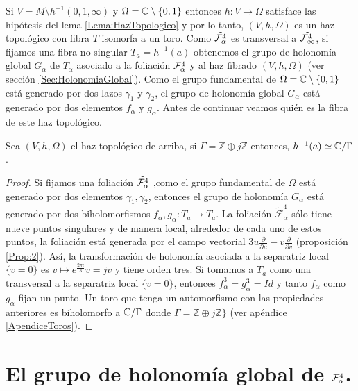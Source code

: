  Si $V=M\setminus h^{-1}(0,1,\infty)$ y $\Omega=\mathbb{C}\setminus\{0,1\}$ entonces $h\colon V\rightarrow\Omega$ satisface las hipótesis del lema \ref{Lema:HazTopologico} y por lo tanto, $(V,h,\Omega)$ es un haz topológico con fibra $T$ isomorfa a un toro. Como $\tilde{\mathcal{F}_{\alpha}^{4}}$ es transversal a $\tilde{\mathcal{F}_{\infty}^{4}}$, si fijamos una fibra no singular $T_{a}=h^{-1}(a)$ obtenemos el grupo de holonomía global $G_{\alpha}$ de $T_{\alpha}$ asociado a la foliación $\tilde{\mathcal{F}_{\alpha}^{4}}$ y al haz fibrado $(V,h,\Omega)$ (ver sección \ref{Sec:HolonomiaGlobal}). Como el grupo fundamental de $\Omega=\mathbb{C}\setminus\{0,1\}$ está generado por dos lazos $\gamma_{1}$ y $\gamma_{2}$, el grupo de holonomía global $G_{\alpha}$ está generado por dos elementos $f_{\alpha}$ y $g_{\alpha}$. Antes de continuar veamos quién es la fibra de este haz topológico.
\begin{Proposicion}
\label{Prop:FibraDelHaz}
Sea $(V,h,\Omega)$ el haz topológico de arriba, si $\Gamma=\mathbb{Z}\oplus j\mathbb{Z}$ entonces, $h^{-1}(a)\simeq\mathbb{C}/\Gamma$.
\end{Proposicion}
\begin{proof}
Si fijamos una foliación $\tilde{\mathcal{F}_{\alpha}^{4}}$ ,como el grupo fundamental de $\Omega$ está generado por dos elementos ${\gamma_{1},\gamma_{2}}$, entonces  el grupo de holonomía $G_{\alpha}$ está generado por dos biholomorfismos $f_{\alpha},g_{\alpha}\colon T_{a}\rightarrow T_{a}$. La foliación $\tilde{\mathcal{F}}_{\alpha}^{4}$ sólo tiene nueve puntos singulares y de manera local, alrededor de cada uno de estos puntos, la foliación está generada por el campo vectorial $3u\tfrac{\partial}{\partial u}-v\tfrac{\partial}{\partial v}$ (proposición \ref{Prop:2}). Así, la transformación de holonomía asociada a la separatriz local $\{v=0\}$ es $v\mapsto e^{\tfrac{2\pi i}{3}}v=jv$ y tiene orden tres. Si tomamos a $T_{a}$ como una transversal a la separatriz local $\{v=0\}$, entonces $f_{\alpha}^{3}=g_{\alpha}^{3}=Id$ y tanto $f_{\alpha}$ como $g_{\alpha}$ fijan un punto. Un toro que tenga un automorfismo con las propiedades anteriores es biholomorfo a $\mathbb{C}/\Gamma$ donde $\Gamma=\mathbb{Z}\oplus j\mathbb{Z} \}$ (ver apéndice \ref{ApendiceToros}).
\end{proof}

\section{El grupo de holonomía global de $\tilde{\mathcal{F}_{\alpha}^{4}}$.}

